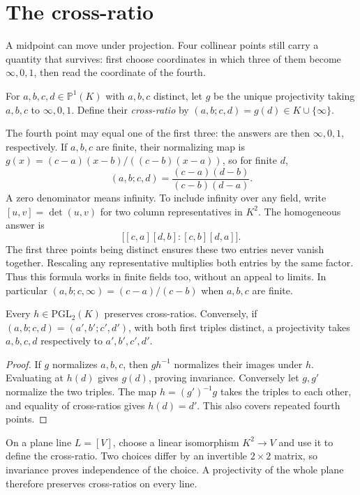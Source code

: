 \section{The cross-ratio}

A midpoint can move under projection. Four collinear points still carry a quantity that survives: first choose coordinates in which three of them become $\infty,0,1$, then read the coordinate of the fourth.

\begin{definition}\label{geometry:def:crossratio}
For $a,b,c,d\in\mathbb P^1(K)$ with $a,b,c$ distinct, let $g$ be the unique projectivity taking $a,b,c$ to $\infty,0,1$. Define their \emph{cross-ratio} by $(a,b;c,d)=g(d)\in K\cup\{\infty\}$.
\end{definition}

The fourth point may equal one of the first three: the answers are then $\infty,0,1$, respectively. If $a,b,c$ are finite, their normalizing map is $g(x)=(c-a)(x-b)/((c-b)(x-a))$, so for finite $d$,
\begin{equation}\label{geometry:eq:crossratio}
(a,b;c,d)=\frac{(c-a)(d-b)}{(c-b)(d-a)}.
\end{equation}
A zero denominator means infinity. To include infinity over any field, write $[u,v]=\det(u,v)$ for two column representatives in $K^2$. The homogeneous answer is
\[
\bigl[[c,a][d,b]:[c,b][d,a]\bigr].
\]
The first three points being distinct ensures these two entries never vanish together. Rescaling any representative multiplies both entries by the same factor. Thus this formula works in finite fields too, without an appeal to limits. In particular $(a,b;c,\infty)=(c-a)/(c-b)$ when $a,b,c$ are finite.

\begin{theorem}\label{geometry:thm:crossratio}
Every $h\in\mathrm{PGL}_2(K)$ preserves cross-ratios. Conversely, if $(a,b;c,d)=(a',b';c',d')$, with both first triples distinct, a projectivity takes $a,b,c,d$ respectively to $a',b',c',d'$.
\end{theorem}
\begin{proof}
If $g$ normalizes $a,b,c$, then $g h^{-1}$ normalizes their images under $h$. Evaluating at $h(d)$ gives $g(d)$, proving invariance. Conversely let $g,g'$ normalize the two triples. The map $h=(g')^{-1}g$ takes the triples to each other, and equality of cross-ratios gives $h(d)=d'$. This also covers repeated fourth points.
\end{proof}

On a plane line $L=[V]$, choose a linear isomorphism $K^2\to V$ and use it to define the cross-ratio. Two choices differ by an invertible $2\times2$ matrix, so invariance proves independence of the choice. A projectivity of the whole plane therefore preserves cross-ratios on every line.

